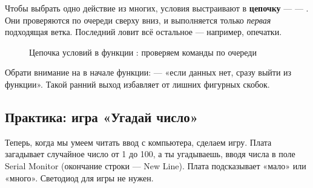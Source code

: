 Чтобы выбрать одно действие из многих, условия выстраивают в \textbf{цепочку}  ---  ---
. Они проверяются по очереди сверху вниз, и выполняется только \emph{первая} подходящая ветка.
Последний  ловит всё остальное --- например, опечатки.

\begin{figure}[H]
\centering
{}
\caption{Цепочка условий в функции : проверяем команды по очереди}
\end{figure}

Обрати внимание на  в начале функции:  --- «если данных
нет, сразу выйти из функции». Такой ранний выход избавляет от лишних фигурных скобок.

\subsection{Практика: игра «Угадай число»}

Теперь, когда мы умеем читать ввод с компьютера, сделаем игру. Плата загадывает случайное число от 1 до 100,
а ты угадываешь, вводя числа в поле Serial Monitor (окончание строки --- \textsf{New Line}). Плата подсказывает
«мало» или «много». Светодиод для игры не нужен.

